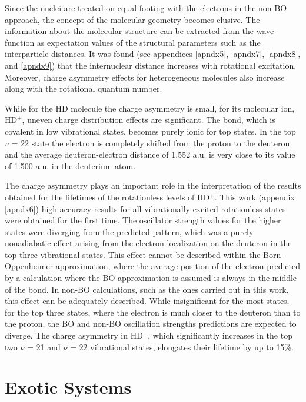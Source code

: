 Since the nuclei are treated on equal footing with the electrons in the non-BO approach, 
the concept of the molecular geometry becomes elusive. The information about the molecular
structure can be extracted from the wave function as expectation values of the structural
parameters such as the interparticle distances. It was found (see appendices \ref{apndx5},
\ref{apndx7}, \ref{apndx8}, and \ref{apndx9}) that the internuclear distance increases
with rotational excitation. Moreover, charge asymmetry effects for heterogeneous molecules
also increase along with the rotational quantum number. 

While for the HD molecule the charge asymmetry is small, for its molecular ion, HD$^+$,
uneven charge distribution effects are significant. The bond, which is covalent in low
vibrational states, becomes purely ionic for top states. In the top $v$ = 22 state the 
electron is completely shifted from the proton to the deuteron and the average 
deuteron-electron distance of 1.552 a.u. is very close to its value of 1.500 a.u.
in the deuterium atom.

The charge asymmetry plays an important role in the interpretation of the results
obtained for the lifetimes of the rotationless levels of HD$^+$. This work (appendix
\ref{apndx6}) high accuracy results for all vibrationally excited rotationless states 
were obtained for the first time. The oscillator strength values for the higher
states were diverging from the predicted pattern, which was a 
purely nonadiabatic effect arising from the electron localization on the
deuteron in the top three vibrational states. This effect cannot be described within 
the Born-Oppenheimer approximation, where the average position of the electron predicted 
by a calculation where the BO approximation is assumed is always in the middle of the bond. 
In non-BO calculations, such as the ones carried out in this work, this effect can be
adequately described. While insignificant for the most states, for the top three states, 
where the electron is much closer to the deuteron than to the proton, the BO and non-BO oscillation strengths predictions are expected to diverge.
The charge asymmetry in HD$^+$, which significantly increases in the top two 
$ν$ = 21 and $ν$ = 22 vibrational states, elongates their lifetime by up to 15$\%$.

\section{Exotic Systems}

